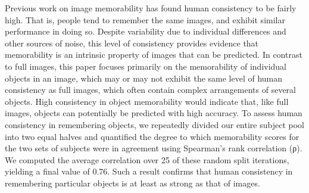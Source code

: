 Previous work on image memorability has found human consistency to be fairly high. That is, people tend to remember the same images, and exhibit similar performance in doing so. Despite variability due to individual differences and other sources of noise, this level of consistency provides evidence that memorability is an intrinsic property of images that can be predicted. In contrast to full images, this paper focuses primarily on the memorability of individual objects in an image, which may or may not exhibit the same level of human consistency as full images, which often contain complex arrangements of several objects. High consistency in object memorability would indicate that, like full images, objects can potentially be predicted with high accuracy. To assess human consistency in remembering objects, we repeatedly divided our entire subject pool into two equal halves and quantified the degree to which memorability scores for the two sets of subjects were in agreement using Spearman’s rank correlation (ρ). We computed the average correlation over 25 of these random split iterations, yielding a final value of 0.76. Such a result confirms that human consistency in remembering particular objects is at least as strong as that of images.  